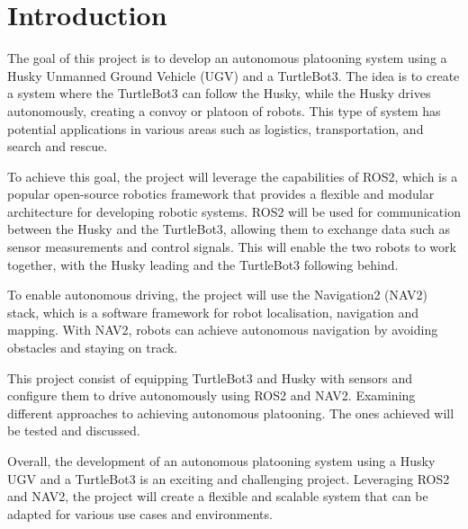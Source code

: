 \chapter{Introduction}

The goal of this project is to develop an autonomous platooning system using a Husky Unmanned Ground Vehicle (UGV) and a TurtleBot3. The idea is to create a system where the TurtleBot3 can follow the Husky, while the Husky drives autonomously, creating a convoy or platoon of robots. This type of system has potential applications in various areas such as logistics, transportation, and search and rescue.

To achieve this goal, the project will leverage the capabilities of ROS2, which is a popular open-source robotics framework that provides a flexible and modular architecture for developing robotic systems. ROS2 will be used for communication between the Husky and the TurtleBot3, allowing them to exchange data such as sensor measurements and control signals. This will enable the two robots to work together, with the Husky leading and the TurtleBot3 following behind.

To enable autonomous driving, the project will use the Navigation2 (NAV2) stack, which is a software framework for robot localisation, navigation and mapping. With NAV2, robots can achieve autonomous navigation by avoiding obstacles and staying on track.

This project consist of equipping TurtleBot3 and Husky with sensors and configure them to drive autonomously using ROS2 and NAV2. Examining different approaches to achieving autonomous platooning. The ones achieved will be tested and discussed.  

Overall, the development of an autonomous platooning system using a Husky UGV and a TurtleBot3 is an exciting and challenging project. Leveraging ROS2 and NAV2, the project will create a flexible and scalable system that can be adapted for various use cases and environments.